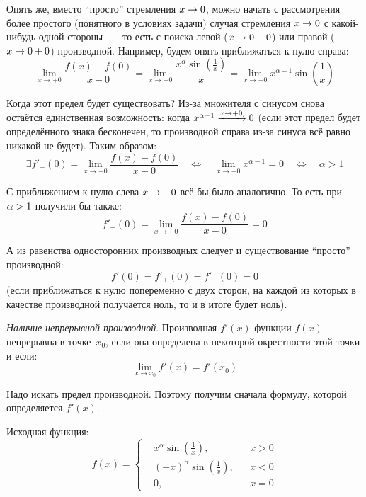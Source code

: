 \documentclass[a4paper,12pt]{article}
\begin{document}
\begin{solution}
    Опять же, вместо ``просто'' стремления $x \hm\to 0$, можно начать с рассмотрения более простого (понятного в условиях задачи) случая стремления $x \hm\to 0$ с какой-нибудь одной стороны~---~то есть с поиска левой ($x \hm\to 0 \hm- 0$) или правой ($x \hm\to 0 \hm+ 0$) производной.
    Например, будем опять приближаться к нулю справа:
    \[
      \lim_{x \to +0} \frac{f(x) - f(0)}{x - 0}
        = \lim_{x \to +0} \frac{x^{\alpha} \sin{\left(\frac{1}{x}\right)}}{x}
        = \lim_{x \to +0} x^{\alpha - 1} \sin{\left(\frac{1}{x}\right)}
    \]

    Когда этот предел будет существовать?
    Из-за множителя с синусом снова остаётся единственная возможность: когда $x^{\alpha - 1} \hm{\xrightarrow{x \to +0}} 0$ (если этот предел будет определённого знака бесконечен, то производной справа из-за синуса всё равно никакой не будет).
    Таким образом:
    \[
      \exists f'_{+}(0) = \lim_{x \to +0} \frac{f(x) - f(0)}{x - 0}
        \quad\Leftrightarrow\quad \lim_{x \to +0} x^{\alpha - 1} = 0
        \quad\Leftrightarrow\quad \alpha > 1
    \]

    С приближением к нулю слева $x \hm\to -0$ всё бы было аналогично.
    То есть при $\alpha \hm> 1$ получили бы также:
    \[
      f'_{-}(0) = \lim_{x \to -0} \frac{f(x) - f(0)}{x - 0} = 0
    \]

    А из равенства односторонних производных следует и существование ``просто'' производной:
    \[
      f'(0) = f'_{+}(0) = f'_{-}(0) = 0
    \]
    (если приближаться к нулю попеременно с двух сторон, на каждой из которых в качестве производной получается ноль, то и в итоге будет ноль).

    \medskip
    
    \noindent
    \emph{Наличие непрерывной производной}.
    Производная $f'(x)$ функции $f(x)$ непрерывна в точке~$x_0$, если она определена в некоторой окрестности этой точки и если:
    \[
      \lim_{x \to x_0} f'(x) = f'(x_0)
    \]

    Надо искать предел производной.
    Поэтому получим сначала формулу, которой определяется $f'(x)$.

    Исходная функция:
    \[
      f(x) = \left\{
        \begin{aligned}
          &x^{\alpha} \sin{\left(\frac{1}{x}\right)}, & &x > 0\\
          &(-x)^{\alpha} \sin{\left(\frac{1}{x}\right)}, & &x < 0\\
          &0, & &x = 0
        \end{aligned}
      \right.
    \]


\end{solution}
\end{document}
